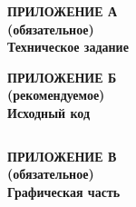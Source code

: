 \newpage

\begin{center}
\textbf{
\MakeUppercase{Приложение А}\\
(обязательное)\\
Техническое задание}
\end{center}
\setcounter{page}{33}

\newpage
\thispagestyle{empty}
\mbox{}

\newpage
\thispagestyle{empty}
\mbox{}

\newpage
\thispagestyle{empty}
\mbox{}

\begin{center}
\textbf{
\MakeUppercase{Приложение Б}\\
(рекомендуемое)\\
Исходный код}
\end{center}
\setcounter{page}{36}

\inputminted{swift}{inc/src/lol.swift}

\newpage

\begin{center}
\textbf{
\MakeUppercase{Приложение В}\\
(обязательное)\\
Графическая часть}
\end{center}
